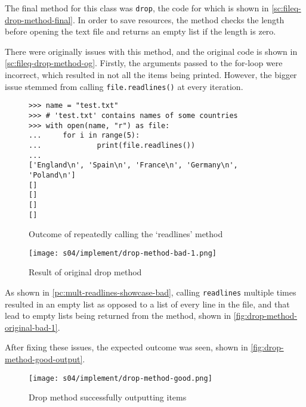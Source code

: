 
        The final method for this class was \verb|drop|, the code for which is shown in \autoref{sc:fileq-drop-method-final}. In order to save resources, the method checks the length before opening the text file and returns an empty list if the length is zero. 

        There were originally issues with this method, and the original code is shown in \autoref{sc:fileq-drop-method-og}. Firstly, the arguments passed to the for-loop were incorrect, which resulted in not all the items being printed. However, the bigger issue stemmed from calling \verb|file.readlines()| at every iteration. 

        \begin{figure}[!ht]
            \begin{verbatim}
>>> name = "test.txt"
>>> # 'test.txt' contains names of some countries
>>> with open(name, "r") as file:
...     for i in range(5):
...             print(file.readlines())
... 
['England\n', 'Spain\n', 'France\n', 'Germany\n', 'Poland\n']
[]
[]
[]
[] 
            \end{verbatim}
            \caption{Outcome of repeatedly calling the `readlines' method}
            \label{pc:mult-readlines-showcase-bad}
        \end{figure}

        \begin{figure}[!ht]
            \centering
            \texttt{[image: s04/implement/drop-method-bad-1.png]}
            \caption{Result of original drop method}
            \label{fig:drop-method-original-bad-1}
        \end{figure}

        As shown in \autoref{pc:mult-readlines-showcase-bad}, calling \verb|readlines| multiple times resulted in an empty list as opposed to a list of every line in the file, and that lead to empty lists being returned from the method, shown in \autoref{fig:drop-method-original-bad-1}.


        After fixing these issues, the expected outcome was seen, shown in \autoref{fig:drop-method-good-output}.

        \begin{figure}[!ht]
            \centering
            \texttt{[image: s04/implement/drop-method-good.png]}
            \caption{Drop method successfully outputting items}
            \label{fig:drop-method-good-output}
        \end{figure}

